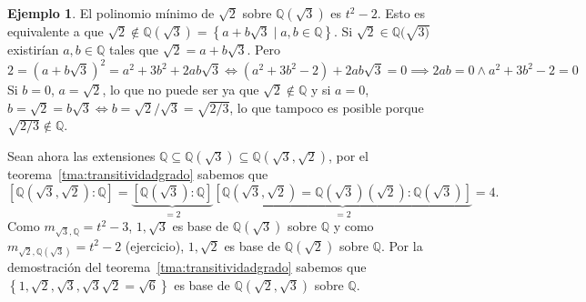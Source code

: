 \documentclass[10pt, spanish]{report}
\theoremstyle{definition}
\newtheorem*{ej}{Ejemplo}
\theoremstyle{custom}
\theoremstyle{remark}
\newcommand{\Q}{\mathbb{Q}}
\begin{document}
\begin{ej}
    El polinomio mínimo de $\sqrt{2}$ sobre $\Q(\sqrt{3})$ es
    $t^2-2$. Esto es equivalente a que
    $\sqrt{2}\not\in\Q(\sqrt{3})=\left\{ a+b\sqrt{3}\mid a,b\in\Q\right\}$. Si
    $\sqrt{2}\in\Q(\sqrt{3)}$ existirían $a,b\in\Q$ tales que
    $\sqrt{2}=a+b\sqrt{3}$. Pero \[2=(a+b\sqrt{3})^2=a^2+3b^2+2ab\sqrt{3}
        \Leftrightarrow (a^2+3b^2-2)+2ab\sqrt{3}=0 \implies 2ab=0 \wedge
        a^2+3b^2-2=0\]
     Si $b=0$, $a=\sqrt{2}$, lo que no puede ser ya que $\sqrt{2}\not\in\Q$ y
     si $a=0$, $b=\sqrt{2}=b\sqrt{3} \Leftrightarrow b={\sqrt{2}}/{\sqrt{3}}=
     \sqrt{{2}/{3}}$, lo que tampoco es posible porque $\sqrt{{2}/{3}}\not\in\Q$.

    Sean ahora las extensiones $\Q\subseteq\Q(\sqrt{3})\subseteq
    \Q(\sqrt{3},\sqrt{2})$, por el teorema~\ref{tma:transitividadgrado} sabemos que
    \[[\Q(\sqrt{3},\sqrt{2}):\Q]=\underbrace{[\Q(\sqrt{3}):\Q]}_{=2}\underbrace{
      [\Q(\sqrt{3},\sqrt{2})=\Q(\sqrt{3})(\sqrt{2}):\Q(\sqrt{3})]}_{=2}=4.\]
    Como $m_{\sqrt{3},\Q}=t^2-3$, $1,\sqrt{3}$ es base de $\Q(\sqrt{3})$ sobre
    $\Q$ y como $m_{\sqrt{2},\Q(\sqrt{3})}=t^2-2$ (ejercicio), $1,\sqrt{2}$ es
    base de $\Q(\sqrt{2})$ sobre $\Q$. Por la demostración del
    teorema~\ref{tma:transitividadgrado} sabemos que $\left\{1,\sqrt{2},\sqrt{3},
    \sqrt{3}\sqrt{2}=\sqrt{6}\right\}$ es base de $\Q(\sqrt{2},\sqrt{3})$ sobre
    $\Q$.
\end{ej}
\end{document}
